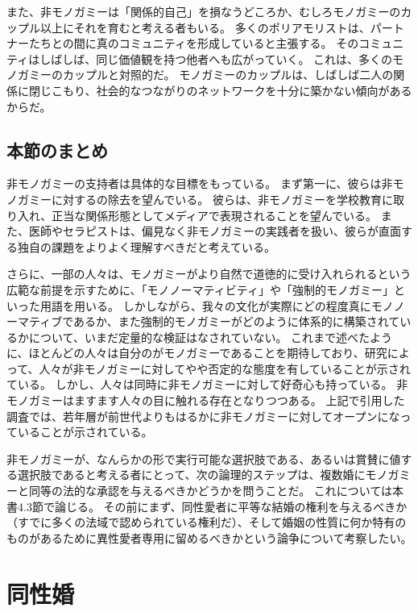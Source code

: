 \documentclass[paper=a4,book,openany]{jlreq} \usepackage{mystyle}
\begin{document}
また、非モノガミーは「関係的自己」を損なうどころか、むしろモノガミーのカップル以上にそれを育むと考える者もいる。
多くのポリアモリストは、パートナーたちとの間に真のコミュニティを形成していると主張する。
そのコミュニティはしばしば、同じ価値観を持つ他者へも広がっていく。
これは、多くのモノガミーのカップルと対照的だ。
モノガミーのカップルは、しばしば二人の関係に閉じこもり、社会的なつながりのネットワークを十分に築かない傾向があるからだ。

\subsection{本節のまとめ}

非モノガミーの支持者は具体的な目標をもっている。
まず第一に、彼らは非モノガミーに対するの除去を望んでいる。
彼らは、非モノガミーを学校教育に取り入れ、正当な関係形態としてメディアで表現されることを望んでいる。
また、医師やセラピストは、偏見なく非モノガミーの実践者を扱い、彼らが直面する独自の課題をよりよく理解すべきだと考えている。

さらに、一部の人々は、モノガミーがより自然で道徳的に受け入れられるという広範な前提を示すために、「モノノーマティビティ」や「強制的モノガミー」といった用語を用いる。
しかしながら、我々の文化が実際にどの程度真にモノノーマティブであるか、また強制的モノガミーがどのように体系的に構築されているかについて、いまだ定量的な検証はなされていない。
これまで述べたように、ほとんどの人々は自分のがモノガミーであることを期待しており、研究によって、人々が非モノガミーに対してやや否定的な態度を有していることが示されている\citep{conley13:_fewer_merrier}。
しかし、人々は同時に非モノガミーに対して好奇心も持っている。
非モノガミーはますます人々の目に触れる存在となりつつある。
上記で引用した調査では、若年層が前世代よりもはるかに非モノガミーに対してオープンになっていることが示されている。

非モノガミーが、なんらかの形で実行可能な選択肢である、あるいは賞賛に値する選択肢であると考える者にとって、次の論理的ステップは、複数婚にモノガミーと同等の法的な承認を与えるべきかどうかを問うことだ。
これについては本書4.3節で論じる。
その前にまず、同性愛者に平等な結婚の権利を与えるべきか（すでに多くの法域で認められている権利だ）、そして婚姻の性質に何か特有のものがあるために異性愛者専用に留めるべきかという論争について考察したい。

\section{同性婚}
\end{document}
